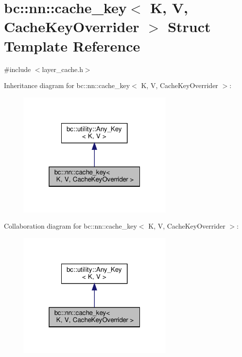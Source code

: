 \hypertarget{structbc_1_1nn_1_1cache__key}{}\section{bc\+:\+:nn\+:\+:cache\+\_\+key$<$ K, V, Cache\+Key\+Overrider $>$ Struct Template Reference}
\label{structbc_1_1nn_1_1cache__key}


{\ttfamily \#include $<$layer\+\_\+cache.\+h$>$}



Inheritance diagram for bc\+:\+:nn\+:\+:cache\+\_\+key$<$ K, V, Cache\+Key\+Overrider $>$\+:\nopagebreak
\begin{figure}[H]
\begin{center}
\leavevmode
\includegraphics[width=220pt]{structbc_1_1nn_1_1cache__key__inherit__graph}
\end{center}
\end{figure}


Collaboration diagram for bc\+:\+:nn\+:\+:cache\+\_\+key$<$ K, V, Cache\+Key\+Overrider $>$\+:\nopagebreak
\begin{figure}[H]
\begin{center}
\leavevmode
\includegraphics[width=220pt]{structbc_1_1nn_1_1cache__key__coll__graph}
\end{center}
\end{figure}

